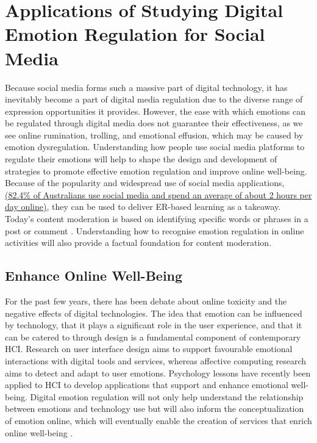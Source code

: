 \documentclass[lettersize,journal]{IEEEtran}
\begin{document}
\section{Applications of Studying Digital Emotion Regulation for Social Media}
Because social media forms such a massive part of digital technology, it has inevitably become a part of digital media regulation due to the diverse range of expression opportunities it provides. However, the ease with which emotions can be regulated through digital media does not guarantee their effectiveness, as we see online rumination, trolling, and emotional effusion, which may be caused by emotion dysregulation. Understanding how people use social media platforms to regulate their emotions will help to shape the design and development of strategies to promote effective emotion regulation and improve online well-being. Because of the popularity and widespread use of social media applications,  \href{https://www.genroe.com/blog/social-media-statistics-australia/13492
}{(82.4\% of Australians use social media and spend an average of about 2 hours per day online)}, they can be used to deliver ER-based learning as a takeaway. Today's content moderation is based on identifying specific words or phrases in a post or comment \cite{thomas2022s}. Understanding how to recognise emotion regulation in online activities will also provide a factual foundation for content moderation.
\subsection{Enhance Online Well-Being}
For the past few years, there has been debate about online toxicity and the negative effects of digital technologies. The idea that emotion can be influenced by technology, that it plays a significant role in the user experience, and that it can be catered to through design is a fundamental component of contemporary HCI. Research on user interface design aims to support favourable emotional interactions with digital tools and services, whereas affective computing research aims to detect and adapt to user emotions. Psychology lessons have recently been applied to HCI to develop applications that support and enhance emotional well-being. Digital emotion regulation will not only help understand the relationship between emotions and technology use but will also inform the conceptualization of emotion online, which will eventually enable the creation of services that enrich online well-being \cite{wadley2022future}.
\end{document}
